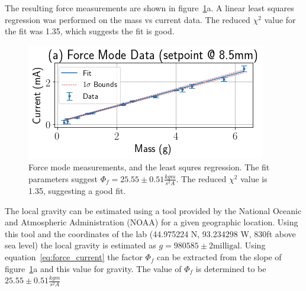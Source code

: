 \documentclass[aps,prstab,reprint,12pt]{revtex4-1}
\begin{document}
The resulting force measurements are shown in figure~\ref{fig:force-data}a. A linear least squares regression was performed on the mass vs current data. The reduced $\chi^2$ value for the fit was 1.35, which suggests the fit is good.

\begin{figure}[b]
    \centering
    \includegraphics[width=\linewidth]{figs/data/force_data.png}
    \caption{Force mode measurements, and the least squres regression. The fit parameters suggest $\Phi_f=25.55 \pm 0.51\si{\frac{kgm}{s^2A}}$. The reduced $\chi^2$ value is 1.35, suggesting a good fit.}
    \label{fig:force-data}
\end{figure}


The local gravity can be estimated using a tool provided by the National Oceanic and Atmospheric Administration (NOAA) for a given geographic location. Using this tool and the coordinates of the lab (44.975224 N, 93.234298 W, 830ft above sea level) the local gravity is estimated as $g=980585\pm2\mathrm{milligal}$. Using equation~\ref{eq:force_current} the factor $\Phi_f$ can be extracted from the slope of figure~\ref{fig:force-data}a and this value for gravity. The value of $\Phi_f$ is determined to be $25.55 \pm 0.51\si{\frac{kgm}{s^2A}}$


\end{document}

